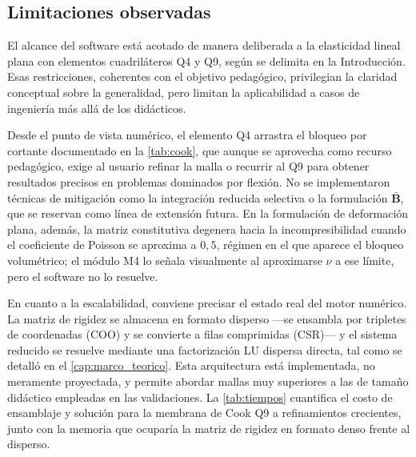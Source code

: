 \subsection{Limitaciones observadas}

El alcance del software está acotado de manera deliberada a la elasticidad lineal plana con elementos cuadriláteros Q4 y Q9, según se delimita en la Introducción. Esas restricciones, coherentes con el objetivo pedagógico, privilegian la claridad conceptual sobre la generalidad, pero limitan la aplicabilidad a casos de ingeniería más allá de los didácticos.

Desde el punto de vista numérico, el elemento Q4 arrastra el bloqueo por cortante documentado en la \autoref{tab:cook}, que aunque se aprovecha como recurso pedagógico, exige al usuario refinar la malla o recurrir al Q9 para obtener resultados precisos en problemas dominados por flexión. No se implementaron técnicas de mitigación como la integración reducida selectiva o la formulación $\bar{\bm{B}}$, que se reservan como línea de extensión futura. En la formulación de deformación plana, además, la matriz constitutiva degenera hacia la incompresibilidad cuando el coeficiente de Poisson se aproxima a $0{,}5$, régimen en el que aparece el bloqueo volumétrico; el módulo M4 lo señala visualmente al aproximarse $\nu$ a ese límite, pero el software no lo resuelve.

En cuanto a la escalabilidad, conviene precisar el estado real del motor numérico. La matriz de rigidez se almacena en formato disperso ---se ensambla por tripletes de coordenadas (COO) y se convierte a filas comprimidas (CSR)--- y el sistema reducido se resuelve mediante una factorización LU dispersa directa, tal como se detalló en el \autoref{cap:marco_teorico}. Esta arquitectura está implementada, no meramente proyectada, y permite abordar mallas muy superiores a las de tamaño didáctico empleadas en las validaciones. La \autoref{tab:tiempos} cuantifica el costo de ensamblaje y solución para la membrana de Cook Q9 a refinamientos crecientes, junto con la memoria que ocuparía la matriz de rigidez en formato denso frente al disperso.

